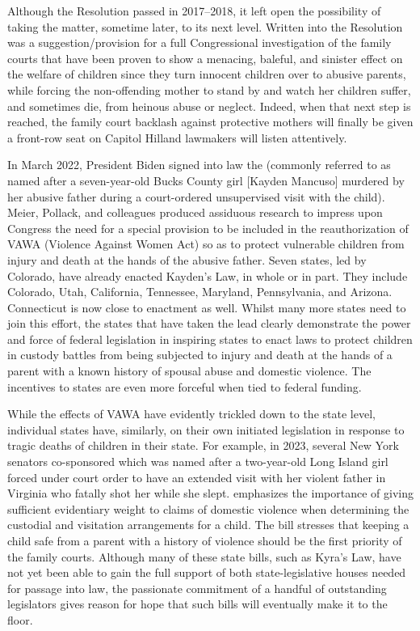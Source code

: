 Although the Resolution passed in 2017--2018, it left open the possibility of taking the matter, sometime later, to its next level. Written
into the Resolution was a suggestion/provision for a full Congressional
investigation of the family courts that have been proven to show a 
menacing, baleful, and sinister effect on 
the welfare of children since they turn innocent 
children over to abusive parents, while forcing 
the non-offending mother to stand by and watch her children suffer,
and sometimes die, from heinous abuse or neglect. Indeed, when that
next step is reached, the family court backlash against protective mothers will finally be given a front-row seat on Capitol Hill\mdash{}and lawmakers
will listen attentively. \pfl{}


In March 2022, President Biden signed into law the  (commonly referred to as  named after a seven-year-old Bucks County girl [Kayden
Mancuso] murdered by her abusive father during a court-ordered unsupervised visit with the child). Meier, Pollack, and colleagues produced
assiduous research to impress upon Congress the need for a special provision to be included in the reauthorization of VAWA (Violence Against
Women Act) so as to protect vulnerable children from injury and death
at the hands of the abusive father. Seven states, led by Colorado, have already enacted Kayden's Law, in whole or in part.
They include Colorado, Utah, California, Tennessee, Maryland, Pennsylvania, and Arizona. Connecticut is now close to enactment as well.
Whilst many more states need to join this effort, the states that have
taken the lead clearly demonstrate the power and force of federal legislation in inspiring states to enact laws to protect children in custody battles
from being subjected to injury and death at the hands of a parent with
a known history of spousal abuse and domestic violence.  The incentives to states are
even more forceful when tied to federal funding. \pfl{}


While the effects of VAWA have evidently trickled down to the state
level, individual states have, similarly, on their own initiated legislation in response to tragic deaths of children in their state. For example,
in 2023, several New York senators co-sponsored  which
was named after a two-year-old Long Island girl forced under court order to have an extended visit with her violent father in Virginia who
fatally shot her while she slept.  emphasizes the importance
of giving sufficient evidentiary weight to claims of domestic violence
when determining the custodial and visitation arrangements for a child.
The bill stresses that keeping a child safe from a parent with a history
of violence should be the first priority of the family courts. Although
many of these state bills, such as Kyra's Law, have not yet been able to
gain the full support of both state-legislative houses needed for passage into law, the passionate commitment of a handful of outstanding
legislators gives reason for hope that such bills will eventually make it to the
floor. \pfl{}

